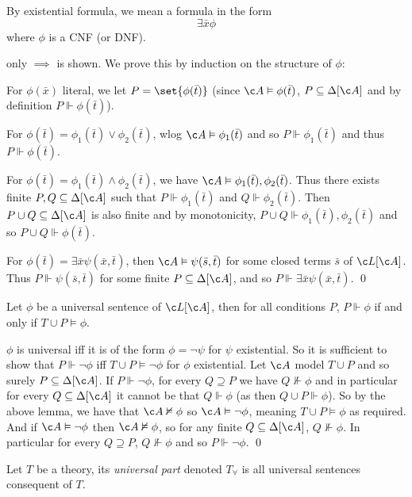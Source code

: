 \elemm

By existential formula, we mean a formula in the form
$$ \exists\bar x\phi $$
where $\phi$ is a CNF (or DNF).

\Proof only $\implies$ is shown.
We prove this by induction on the structure of $\phi$:
\benum
    \item For $\phi(\bar x)$ literal, we let $P=\set{\phi(\bar t)}$ (since $\c A\vDash\phi(\bar t)$, $P\subseteq\Delta[\c A]$ and by definition $P\Vdash\phi(\bar t)$).
    \item For $\phi(\bar t)=\phi_1(\bar t)\lor\phi_2(\bar t)$, wlog $\c A\vDash\phi_1(\bar t)$ and so $P\Vdash\phi_1(\bar t)$ and thus $P\Vdash\phi(\bar t)$.
    \item For $\phi(\bar t)=\phi_1(\bar t)\land\phi_2(\bar t)$, we have $\c A\vDash\phi_1(\bar t),\phi_2(\bar t)$.
    Thus there exists finite $P,Q\subseteq\Delta[\c A]$ such that $P\Vdash\phi_1(\bar t)$ and $Q\Vdash\phi_2(\bar t)$.
    Then $P\cup Q\subseteq\Delta[\c A]$ is also finite and by monotonicity, $P\cup Q\Vdash\phi_1(\bar t),\phi_2(\bar t)$ and so $P\cup Q\Vdash\phi(\bar t)$.
    \item For $\phi(\bar t)=\exists\bar x\psi(\bar x,\bar t)$, then $\c A\vDash\psi(\bar s,\bar t)$ for some closed terms $\bar s$ of $\c L[\c A]$.
    Thus $P\Vdash\psi(\bar s,\bar t)$ for some finite $P\subseteq\Delta[\c A]$, and so $P\Vdash\exists\bar x\psi(\bar x,\bar t)$.
    \qed
\eenum

\blemm[name=lemm3.8]

    Let $\phi$ be a universal sentence of $\c L[\c A]$, then for all conditions $P$, $P\Vdash\phi$ if and only if $T\cup P\vDash\phi$.

\elemm

\Proof $\phi$ is universal iff it is of the form $\phi=\neg\psi$ for $\psi$ existential.
So it is sufficient to show that $P\Vdash\neg\phi$ iff $T\cup P\vDash\neg\phi$ for $\phi$ existential.
Let $\c A$ model $T\cup P$ and so surely $P\subseteq\Delta[\c A]$.
If $P\Vdash\neg\phi$, for every $Q\supseteq P$ we have $Q\nVdash\phi$ and in particular for every $Q\subseteq\Delta[\c A]$ it cannot be that $Q\Vdash\phi$ (as then $Q\cup P\Vdash\phi$).
So by the above lemma, we have that $\c A\nvDash\phi$ so $\c A\vDash\neg\phi$, meaning $T\cup P\vDash\phi$ as required.
And if $\c A\vDash\neg\phi$ then $\c A\nvDash\phi$, so for any finite $Q\subseteq\Delta[\c A]$, $Q\nVdash\phi$.
In particular for every $Q\supseteq P$, $Q\nVdash\phi$ and so $P\Vdash\neg\phi$.
\qed

Let $T$ be a theory, its {\it universal part} denoted $T_\forall$ is all universal sentences consequent of $T$.

